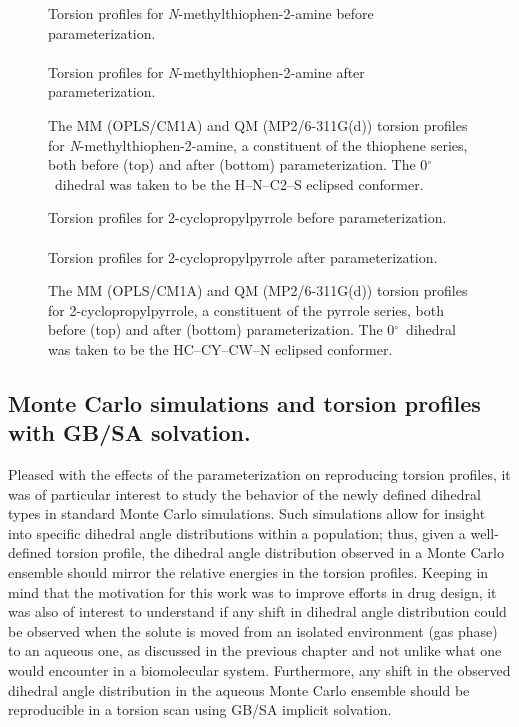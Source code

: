\documentclass[12pt]{report}
\def\deg{$^{\circ}$}
\begin{document}
\begin{figure}[htbp]
\centering
Torsion profiles for \textit{N}-methylthiophen-2-amine before parameterization.\\
\\
Torsion profiles for \textit{N}-methylthiophen-2-amine after parameterization.\\

\caption{The MM (OPLS/CM1A) and QM (MP2/6-311G(d)) torsion profiles for \textit{N}-methylthiophen-2-amine, a constituent of the thiophene series, both before (top) and after (bottom) parameterization. The 0\deg\ dihedral was taken to be the H--N--C2--S eclipsed conformer.}
\label{dihthnhme}
\end{figure}

\begin{figure}[htbp]
\centering
Torsion profiles for 2-cyclopropylpyrrole before parameterization.\\
\\
Torsion profiles for 2-cyclopropylpyrrole after parameterization.\\

\caption{The MM (OPLS/CM1A) and QM (MP2/6-311G(d)) torsion profiles for 2-cyclopropylpyrrole, a constituent of the pyrrole series, both before (top) and after (bottom) parameterization. The 0\deg\ dihedral was taken to be the HC--CY--CW--N eclipsed conformer.}
\label{dihp5cpr}
\end{figure}


\subsection{Monte Carlo simulations and torsion profiles with GB/SA solvation.} 

Pleased with the effects of the parameterization on reproducing torsion profiles, it was of particular interest to study the behavior of the newly defined dihedral types in standard Monte Carlo simulations. Such simulations allow for insight into specific dihedral angle distributions within a population; thus, given a well-defined torsion profile, the dihedral angle distribution observed in a Monte Carlo ensemble should mirror the relative energies in the torsion profiles. Keeping in mind that the motivation for this work was to improve efforts in drug design, it was also of interest to understand if any shift in dihedral angle distribution could be observed when the solute is moved from an isolated environment (gas phase) to an aqueous one, as discussed in the previous chapter and not unlike what one would encounter in a biomolecular system. Furthermore, any shift in the observed dihedral angle distribution in the aqueous Monte Carlo ensemble should be reproducible in a torsion scan using GB/SA implicit solvation.
\end{document}
